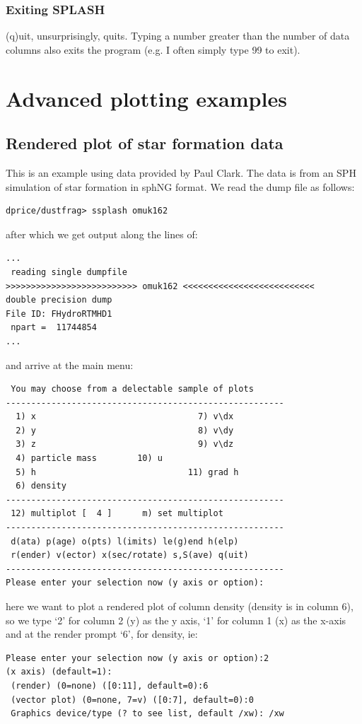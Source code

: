 \documentclass[a4paper,10pt]{article}
\newcommand{\splash}{\textsc{SPLASH }}
\begin{document}
\subsubsection{ Exiting \splash}
 (q)uit, unsurprisingly, quits. Typing a number greater than the number of
data columns also exits the program (e.g. I often simply type 99 to exit).


\section{Advanced plotting examples}

\subsection{Rendered plot of star formation data}
 This is an example using data provided by Paul Clark. The data is from an SPH simulation of star formation in sphNG format. We read the dump file as follows:
\begin{verbatim}
dprice/dustfrag> ssplash omuk162
\end{verbatim}
after which we get output along the lines of:
\begin{verbatim}
...
 reading single dumpfile
>>>>>>>>>>>>>>>>>>>>>>>>>> omuk162 <<<<<<<<<<<<<<<<<<<<<<<<<<
double precision dump
File ID: FHydroRTMHD1
 npart =  11744854
...
\end{verbatim}
and arrive at the main menu:
\begin{verbatim}
 You may choose from a delectable sample of plots 
-------------------------------------------------------
  1) x                                7) v\dx                
  2) y                                8) v\dy                
  3) z                                9) v\dz                
  4) particle mass        10) u                   
  5) h                              11) grad h              
  6) density             
-------------------------------------------------------
 12) multiplot [  4 ]      m) set multiplot 
-------------------------------------------------------
 d(ata) p(age) o(pts) l(imits) le(g)end h(elp)
 r(ender) v(ector) x(sec/rotate) s,S(ave) q(uit)
-------------------------------------------------------
Please enter your selection now (y axis or option):
\end{verbatim}
here we want to plot a rendered plot of column density (density is in column 6), so we type `2' for column 2 (y) as the y axis, `1' for column 1 (x) as the x-axis and at the render prompt `6', for density, ie:
\begin{verbatim}
Please enter your selection now (y axis or option):2
(x axis) (default=1):
 (render) (0=none) ([0:11], default=0):6
 (vector plot) (0=none, 7=v) ([0:7], default=0):0
 Graphics device/type (? to see list, default /xw): /xw
\end{verbatim}
\end{document}
